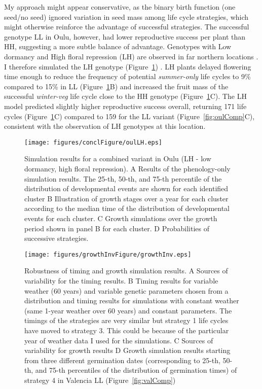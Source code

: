 My approach might appear conservative, as the binary birth function (one seed/no
seed) ignored variation in seed mass among life cycle strategies, which might
otherwise reinforce the advantage of successful strategies. The successful
genotype LL in Oulu, however, had lower reproductive success per plant than HH,
suggesting a more subtle balance of advantage. Genotypes with Low dormancy and
High floral repression (LH) are observed in far northern locations
\citep{atwell_genome-wide_2010}. I therefore simulated the LH genotype
(Figure~\ref{fig:oulLH}) . LH plants delayed flowering time enough to reduce the
frequency of potential \emph{summer-only} life cycles to 9\% compared to 15\% in
LL (Figure~\ref{fig:oulLH}B) and increased the fruit mass of the successful
\emph{winter-veg} life cycle close to the HH genotype
(Figure~\ref{fig:oulLH}C). The LH model predicted slightly higher reproductive
success overall, returning 171 life cycles (Figure~\ref{fig:oulLH}C) compared to
159 for the LL variant (Figure~\ref{fig:oulComp}C), consistent with the
observation of LH genotypes at this location.

\begin{figure}[tb]
\centering
\texttt{[image: figures/conclFigure/oulLH.eps]}
\caption{Simulation results for a combined variant in Oulu (LH - low dormancy,
  high floral repression). A Results of the phenology-only simulation
  results. The 25-th, 50-th, and 75-th percentile of the distribution of
  developmental events are shown for each identified cluster B Illustration of
  growth stages over a year for each cluster according to the median time of the
  distribution of developmental events for each cluster. C Growth simulations
  over the growth period shown in panel B for each cluster.  D Probabilities of
  successive strategies.}
\label{fig:oulLH}
\end{figure}

\begin{figure}[tb]
\centering
\texttt{[image: figures/growthInvFigure/growthInv.eps]}
\caption{Robustness of timing and growth simulation results.  A Sources of
  variability for the timing results. B Timing results for variable weather (60
  years) and variable genetic parameters chosen from a distribution and timing
  results for simulations with constant weather (same 1-year weather over 60
  years) and constant parameters. The timings of the strategies are very similar
  but strategy 1 life cycles have moved to strategy 3. This could be because of
  the particular year of weather data I used for the simulations. C Sources of
  variability for growth results D Growth simulation results starting from three
  different germination dates (corresponding to 25-th, 50-th, and 75-th
  percentiles of the distribution of germination times) of strategy 4 in
  Valencia LL (Figure~\ref{fig:valComp})}
\label{fig:growthInv}
\end{figure}

